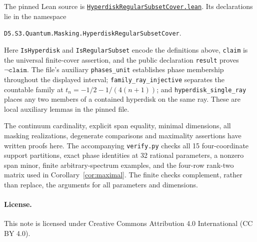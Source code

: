 \documentclass[11pt]{article}
\begin{document}
The pinned Lean source is
\href{https://github.com/the-omega-institute/trureturing/blob/01b573fd9b691a4be3a8b0ecbb41b3311eda19b5/D5/S3/Quantum/Masking/HyperdiskRegularSubsetCover.lean}{\texttt{HyperdiskRegularSubsetCover.lean}}.
Its declarations lie in the namespace
\begin{center}\small
\texttt{D5.S3.Quantum.Masking.HyperdiskRegularSubsetCover}.
\end{center}
Here \texttt{IsHyperdisk} and \texttt{IsRegularSubset} encode the definitions
above, \texttt{claim} is the universal finite-cover assertion, and the
public declaration \texttt{result} proves \(\neg\texttt{claim}\).
The file's auxiliary \texttt{phases\_unit} establishes phase membership
throughout the displayed interval; \texttt{family\_ray\_injective} separates
the countable family at $t_n=-1/2-1/(4(n+1))$; and
\texttt{hyperdisk\_single\_ray} places any two members of a contained
hyperdisk on the same ray. These are local auxiliary lemmas in the pinned
file.

The continuum cardinality, explicit span equality, minimal dimensions,
all masking realizations, degenerate comparisons and maximality assertions
have written proofs here. The accompanying \texttt{verify.py} checks
all 15 four-coordinate support partitions, exact phase identities at
32 rational parameters, a nonzero span minor, finite arbitrary-spectrum
examples, and the four-row rank-two matrix used in
Corollary~\ref{cor:maximal}. The finite checks complement, rather than
replace, the arguments for all parameters and dimensions.

\paragraph{License.} This note is licensed under Creative Commons
Attribution 4.0 International (CC BY 4.0).
\end{document}

